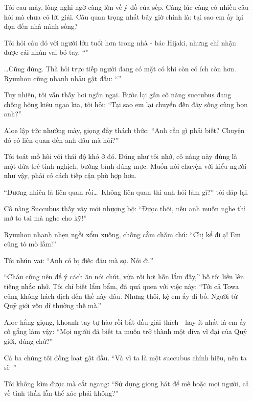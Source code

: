 \documentclass[../main.tex]{subfiles}
\begin{document}
Tôi cau mày, lòng nghi ngờ càng lớn về ý đồ của sếp. Càng lúc càng có nhiều câu hỏi mà chưa có lời giải. Câu quan trọng nhất bây giờ chính là: tại sao em ấy lại dọn đến nhà mình sống?

Tôi hỏi câu đó với người lớn tuổi hơn trong nhà - bác Hijaki, nhưng chỉ nhận được cái nhún vai bó tay. ``''

\dots Cũng đúng. Thà hỏi trực tiếp người đang có mặt có khi còn có ích còn hơn. Ryuuhou cũng nhanh nhảu gật đầu: ``''

Tuy nhiên, tôi vẫn thấy hơi ngần ngại. Bước lại gần cô nàng succubus đang chống hông kiêu ngạo kia, tôi hỏi: ``Tại sao em lại chuyển đến đây sống cùng bọn anh?''

Aloe lập tức nhướng mày, giọng đầy thách thức: ``Anh cần gì phải biết? Chuyện đó có liên quan đến anh đâu mà hỏi?''

Tôi toát mồ hôi với thái độ khó ở đó. Đúng như tôi nhớ, cô nàng này đúng là một đứa trẻ tinh nghịch, bướng bỉnh đúng mực. Muốn nói chuyện với kiểu người như vậy, phải có cách tiếp cận phù hợp hơn.

``Đương nhiên là liên quan rồi\dots\ Không liên quan thì anh hỏi làm gì?'' tôi đáp lại.

Cô nàng Succubus thấy vậy mới nhượng bộ: ``Được thôi, nếu anh muốn nghe thì mở to tai mà nghe cho kỹ!''

Ryuuhou nhanh nhẹn ngồi xổm xuống, chống cằm chăm chú: ``Chị kể đi ạ! Em cũng tò mò lắm!''

Tôi nhún vai: ``Anh có bị điếc đâu mà sợ. Nói đi.''

``Cháu cũng nên để ý cách ăn nói chút, vừa rồi hơi hỗn lắm đấy,'' bố tôi liền lên tiếng nhắc nhở. Tôi chỉ biết lẩm bẩm, đã quá quen với việc này: ``Tới cả Towa cũng không hách dịch đến thế này đâu. Nhưng thôi, kệ em ấy đi bố. Người từ Quỷ giới vốn dĩ thường thế mà.''

Aloe hắng giọng, khoanh tay tự hào rồi bắt đầu giải thích - hay ít nhất là em ấy cố gắng làm vậy: ``Mọi người đã biết ta muốn trở thành một diva vĩ đại của Quỷ giới, đúng chứ?''

Cả ba chúng tôi đồng loạt gật đầu. ``Và vì ta là một succubus chính hiệu, nên ta sẽ--''

Tôi không kìm được mà cắt ngang: ``Sử dụng giọng hát để mê hoặc mọi người, cả về tinh thần lẫn thể xác phải không?''
\end{document}
